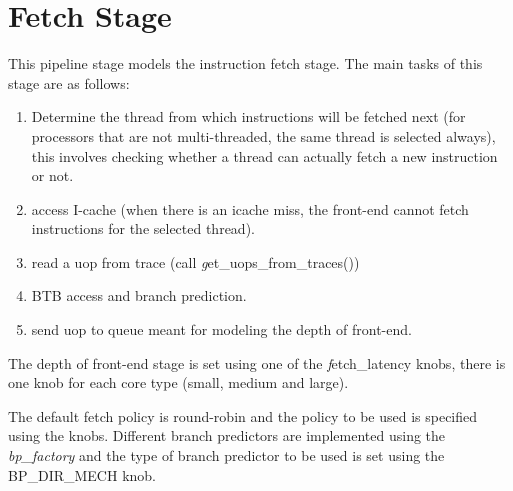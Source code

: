\section{Fetch Stage}
This pipeline stage models the instruction fetch stage. The main tasks
of this stage are as follows:

\begin{enumerate}

\item Determine the thread from which instructions will be fetched next (for
    processors that are not multi-threaded, the same thread is selected
    always), this involves checking whether a thread can actually fetch a new
instruction or not.


\item access I-cache (when there is an icache miss, the front-end cannot fetch
    instructions for the selected thread).

\item read a uop from trace (call {\textit get\_uops\_from\_traces()})

\item BTB access and branch prediction. 

\item send uop to queue meant for modeling the depth of front-end.

\end{enumerate}

The depth of front-end stage is set using one of the {\textit fetch\_latency}
knobs, there is one knob for each core type (small, medium and large).  The default fetch policy is round-robin and the policy
      to be used is specified using the  knobs. Different branch
      predictors are implemented using the \textit{bp\_factory} and the type of
      branch predictor to be used is set using the BP\_DIR\_MECH knob.




